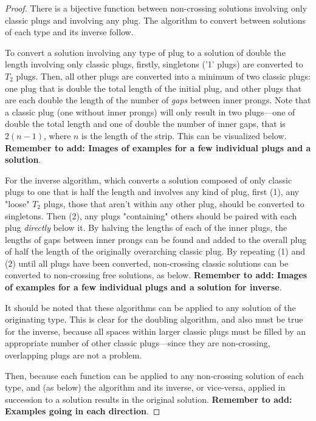 \documentclass[10pt]{article}
\numberwithin{equation}{section}
\begin{document}
\begin{proof}
There is a bijective function between non-crossing solutions involving only classic plugs and involving any plug.  The algorithm to convert between solutions of each type and its inverse follow.

To convert a solution involving any type of plug to a solution of double the length involving only classic plugs, firstly, singletons ('1' plugs) are converted to $T_2$ plugs.  Then, all other plugs are converted into a minimum of two classic plugs: one plug that is double the total length of the initial plug, and other plugs that are each double the length of the number of \textit{gaps} between inner prongs.  Note that a classic plug (one without inner prongs) will only result in two plugs—one of double the total length and one of double the number of inner gaps, that is $2(n-1)$, where $n$ is the length of the strip.  This can be visualized below.
\textbf{Remember to add: Images of examples for a few individual plugs and a solution}.

For the inverse algorithm, which converts a solution composed of only classic plugs to one that is half the length and involves any kind of plug, first (1), any "loose" $T_2$ plugs, those that aren't within any other plug, should be converted to singletons.  Then (2), any plugs "containing" others should be paired with each plug \textit{directly} below it.  By halving the lengths of each of the inner plugs, the lengths of gaps between inner prongs can be found and added to the overall plug of half the length of the originally overarching classic plug.  By repeating (1) and (2) until all plugs have been converted, non-crossing classic solutions can be converted to non-crossing free solutions, as below.
\textbf{Remember to add: Images of examples for a few individual plugs and a solution for inverse}.

It should be noted that these algorithms can be applied to any solution of the originating type.  This is clear for the doubling algorithm, and also must be true for the inverse, because all spaces within larger classic plugs must be filled by an appropriate number of other classic plugs—since they are non-crossing, overlapping plugs are not a problem.

Then, because each function can be applied to any non-crossing solution of each type, and (as below) the algorithm and its inverse, or vice-versa, applied in succession to a solution results in the original solution.
\textbf{Remember to add: Examples going in each direction}.
\end{proof}
\end{document}
